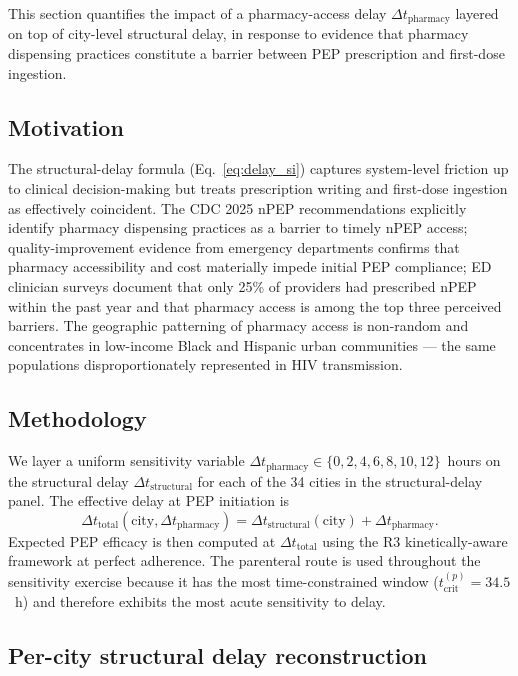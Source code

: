 \documentclass[11pt]{article}
\theoremstyle{definition}
\theoremstyle{remark}
\newcommand{\tcrit}{t_{\text{crit}}}
\begin{document}
This section quantifies the impact of a pharmacy-access delay $\Delta t_{\text{pharmacy}}$ layered on top of city-level structural delay, in response to evidence that pharmacy dispensing practices constitute a barrier between PEP prescription and first-dose ingestion.

\subsection{Motivation}

The structural-delay formula (Eq.~\ref{eq:delay_si}) captures system-level friction up to clinical decision-making but treats prescription writing and first-dose ingestion as effectively coincident. The CDC 2025 nPEP recommendations explicitly identify pharmacy dispensing practices as a barrier to timely nPEP access\cite{tanner2025_si}; quality-improvement evidence from emergency departments confirms that pharmacy accessibility and cost materially impede initial PEP compliance\cite{white2025nPEP_si}; ED clinician surveys document that only 25\% of providers had prescribed nPEP within the past year and that pharmacy access is among the top three perceived barriers\cite{lopezcastillo2020_si}. The geographic patterning of pharmacy access is non-random and concentrates in low-income Black and Hispanic urban communities\cite{qato2017_si} --- the same populations disproportionately represented in HIV transmission.

\subsection{Methodology}

We layer a uniform sensitivity variable $\Delta t_{\text{pharmacy}} \in \{0, 2, 4, 6, 8, 10, 12\}$~hours on the structural delay $\Delta t_{\text{structural}}$ for each of the 34 cities in the structural-delay panel. The effective delay at PEP initiation is
\[
\Delta t_{\text{total}}(\text{city}, \Delta t_{\text{pharmacy}}) = \Delta t_{\text{structural}}(\text{city}) + \Delta t_{\text{pharmacy}}.
\]
Expected PEP efficacy is then computed at $\Delta t_{\text{total}}$ using the R3 kinetically-aware framework at perfect adherence. The parenteral route is used throughout the sensitivity exercise because it has the most time-constrained window ($\tcrit^{(p)} = 34.5$~h) and therefore exhibits the most acute sensitivity to delay.

\subsection{Per-city structural delay reconstruction}
\end{document}
